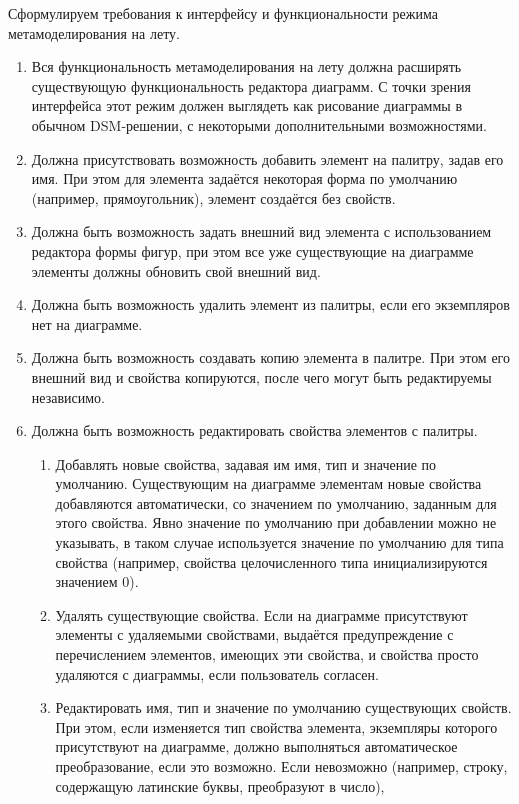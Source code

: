 Сформулируем требования к интерфейсу и функциональности режима метамоделирования на лету.
\begin{enumerate}
	\item Вся функциональность метамоделирования на лету должна расширять существующую 
		функциональность редактора диаграмм. С точки зрения интерфейса этот режим должен 
		выглядеть как рисование диаграммы в обычном DSM-решении, с некоторыми дополнительными 
		возможностями.
	\item Должна присутствовать возможность добавить элемент на палитру, задав его имя. 
		При этом для элемента задаётся некоторая форма по умолчанию (например, прямоугольник), 
		элемент создаётся без свойств.
	\item Должна быть возможность задать внешний вид элемента с использованием редактора 
		формы фигур, при этом все уже существующие на диаграмме элементы должны обновить 
		свой внешний вид.
	\item Должна быть возможность удалить элемент из палитры, если его экземпляров нет на диаграмме.
	\item Должна быть возможность создавать копию элемента в палитре. При этом его внешний 
		вид и свойства копируются, после чего могут быть редактируемы независимо.
	\item Должна быть возможность редактировать свойства элементов с палитры.
		\begin{enumerate}
			\item Добавлять новые свойства, задавая им имя, тип и значение по умолчанию. 
				Существующим на диаграмме элементам новые свойства добавляются автоматически, 
				со значением по умолчанию, заданным для этого свойства. Явно значение по умолчанию 
				при добавлении можно не указывать, в таком случае используется значение по 
				умолчанию для типа свойства (например, свойства целочисленного типа инициализируются 
				значением 0). 
			\item Удалять существующие свойства. Если на диаграмме присутствуют элементы с 
				удаляемыми свойствами, выдаётся предупреждение с перечислением элементов, имеющих 
				эти свойства, и свойства просто удаляются с диаграммы, если пользователь согласен.
			\item Редактировать имя, тип и значение по умолчанию существующих свойств. При 
			этом, если изменяется тип свойства элемента, экземпляры которого присутствуют 
			на диаграмме, должно выполняться автоматическое преобразование, если это возможно. 
			Если невозможно (например, строку, содержащую латинские буквы, преобразуют в число), 

\end{enumerate}
\end{enumerate}
